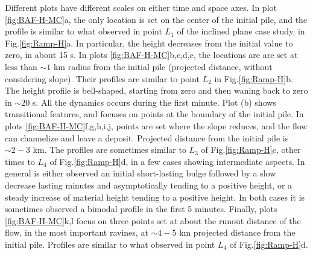 \documentclass{article}
\begin{document}
Different plots have different scales on either time and space axes. In plot \ref{fig:BAF-H-MC}a, the only location is set on the center of the initial pile, and the profile is similar to what observed in point $L_1$ of the inclined plane case study, in Fig.\ref{fig:Ramp-H}a. In particular, the height decreases from the initial value to zero, in about 15 s. In plots \ref{fig:BAF-H-MC}b,c,d,e, the locations are are set at less than $\sim 1$ km radius from the initial pile (projected distance, without considering slope). Their profiles are similar to point $L_2$ in Fig.\ref{fig:Ramp-H}b. The height profile is bell-shaped, starting from zero and then waning back to zero in $\sim 20$ s. All the dynamics occurs during the first minute. Plot (b) shows transitional features, and focuses on points at the boundary of the initial pile. In plots \ref{fig:BAF-H-MC}f,g,h,i,j, points are set where the slope reduces, and the flow can channelize and leave a deposit. Projected distance from the initial pile is $\sim 2-3$ km. The profiles are sometimes similar to $L_3$ of Fig.\ref{fig:Ramp-H}c, other times to $L_4$ of Fig.\ref{fig:Ramp-H}d, in a few cases showing intermediate aspects. In general is either observed an initial short-lasting bulge followed by a slow decrease lasting minutes and asymptotically tending to a positive height, or a steady increase of material height tending to a positive height. In both cases it is sometimes observed a bimodal profile in the first 5 minutes. Finally, plots \ref{fig:BAF-H-MC}k,l focus on three points set at about the runout distance of the flow, in the most important ravines, at $\sim 4-5$ km projected distance from the initial pile. Profiles are similar to what observed in point $L_4$ of Fig.\ref{fig:Ramp-H}d.
\end{document}
